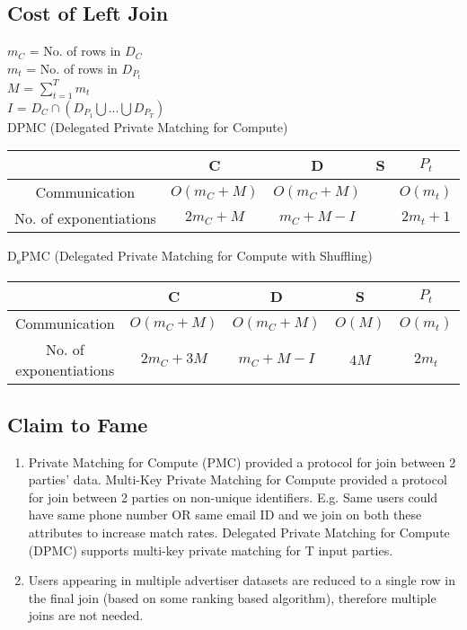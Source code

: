 \subsection{Cost of Left Join}
$m_C$ = No. of rows in $D_C$ \\
$m_t$ = No. of rows in $D_{P_t}$ \\
$M$ = $\sum_{t=1}^T m_t$ \\
$I$ = $D_C \cap (D_{P_1} \bigcup ... \bigcup D_{P_T})$ \\

DPMC (Delegated Private Matching for Compute)
\begin{center}
\begin{tabular}{ | c | c | c | c | c | } 
  \hline
     & \textbf{C} & \textbf{D} & \textbf{S} & \textbf{$P_t$} \\ 
  \hline
  Communication & $O(m_C + M)$ & $O(m_C + M)$ & & $O(m_t)$ \\ 
  \hline
  No. of exponentiations & $2m_C + M$ & $m_C + M - I$ & & $2m_t + 1$ \\ 
  \hline
\end{tabular}
\end{center}

D\textsubscript{s}PMC (Delegated Private Matching for Compute with Shuffling)
\begin{center}
\begin{tabular}{ | c | c | c | c | c | } 
  \hline
     & \textbf{C} & \textbf{D} & \textbf{S} & \textbf{$P_t$} \\ 
  \hline
  Communication & $O(m_C + M)$ & $O(m_C + M)$ & $O(M)$ & $O(m_t)$ \\ 
  \hline
  No. of exponentiations & $2m_C + 3M$ & $m_C + M - I$ & $4M$ & $2m_t$ \\ 
  \hline
\end{tabular}
\end{center}

\subsection{Claim to Fame}
\begin{enumerate}
    \item Private Matching for Compute (PMC) provided a protocol for join between 2 parties' data. Multi-Key Private Matching for Compute provided a protocol for join between 2 parties on non-unique identifiers. E.g. Same users could have same phone number OR same email ID and we join on both these attributes to increase match rates. Delegated Private Matching for Compute (DPMC) supports multi-key private matching for T input parties.
    \item Users appearing in multiple advertiser datasets are reduced to a single row in the final join (based on some ranking based algorithm), therefore multiple joins are not needed.
\end{enumerate}

